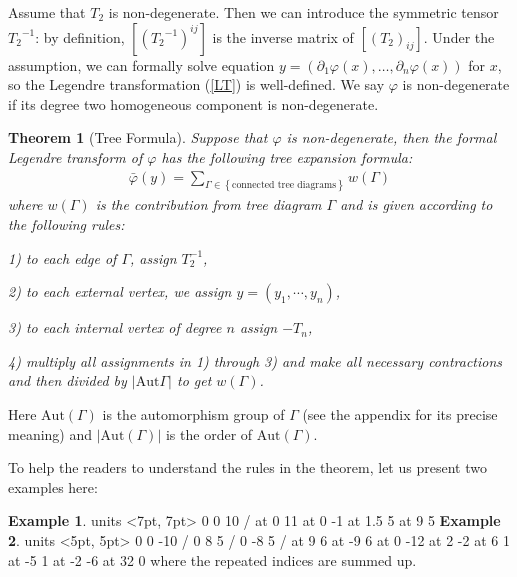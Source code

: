 \documentclass{article}
\newtheorem{Thm}[defn]{Theorem}
\newtheorem{main theorem}[defn]{Main Theorem}
\begin{document}
Assume that $T_2$ is non-degenerate. Then we can introduce
the symmetric tensor ${T_2}^{-1}$: by definition,
$[({T_2}^{-1})^{ij}]$ is the inverse matrix of $[(T_2)_{ij}]$.
Under the assumption, we can formally solve equation $
y=(\partial_1\varphi( x),\ldots,
\partial_n\varphi(x))$ for $x$, so the Legendre
transformation (\ref{LT}) is well-defined. We say $\varphi$ is
non-degenerate if its degree two homogeneous component is
non-degenerate.

\begin{Thm}[Tree Formula]\label{Formula} Suppose that $\varphi$ is non-degenerate,
then the formal Legendre transform of $\varphi$ has the following
tree expansion formula:
\begin{eqnarray}\label{treeformula}
\bar\varphi(y)=\sum_{\Gamma\in\left\{\mbox{connected tree
diagrams}\right\}}w(\Gamma)
\end{eqnarray}
where $w(\Gamma)$ is the contribution from tree diagram $\Gamma$
and is given according to the following rules:

1) to each edge of $\Gamma$, assign $T_2^{-1}$,

2) to each external vertex, we assign $y=(y_1,\cdots,y_n)$,

3) to each internal vertex of degree $n$ assign $-T_n$,

4) multiply all assignments  in 1) through 3) and make all
necessary contractions and  then divided by $|\mathrm{Aut}
\Gamma|$ to get $w(\Gamma)$.
\end{Thm}
Here $\mathrm{Aut}(\Gamma)$ is the automorphism group of $\Gamma$
(see the appendix for its precise meaning) and
$|\mathrm{Aut}(\Gamma)|$ is the order of $\mathrm{Aut}(\Gamma)$.

To help the readers to understand the rules in the theorem, let us
present two examples here:

{\bf Example 1}. \vskip 10pt \hskip 100pt
\beginpicture
\setcoordinatesystem units <7pt, 7pt> \setlinear {} 0  0 10 /
 at 0 11  at 0 -1  at 1.5 5
 at 9 5
\endpicture
\vskip 20pt {\bf Example 2}. \vskip 15pt \hskip 10pt
\beginpicture
\setcoordinatesystem units <5pt, 5pt> \setlinear {} 0  0 -10
/ \setlinear {} 0  8 5 / \setlinear {} 0  -8 5 /
 at 9 6  at -9 6  at 0 -12 
at 2 -2  at 6 1  at -5 1
 at -2 -6 
at 32 0
\endpicture
\vskip 20pt \noindent where the repeated indices are summed up.
\end{document}
